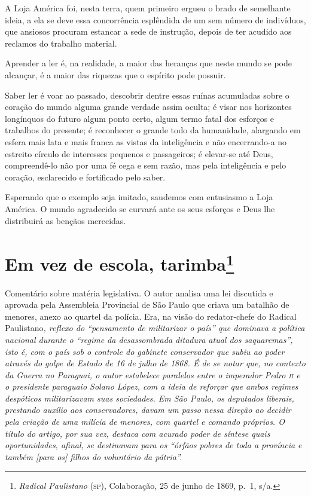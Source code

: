 A Loja América foi, nesta terra, quem primeiro ergueu o brado de
semelhante ideia, a ela se deve essa concorrência esplêndida de um sem
número de indivíduos, que ansiosos procuram estancar a sede de
instrução, depois de ter acudido aos reclamos do trabalho material.

Aprender a ler é, na realidade, a maior das heranças que neste mundo se
pode alcançar, é a maior das riquezas que o espírito pode possuir.

Saber ler é voar ao passado, descobrir dentre essas ruínas acumuladas
sobre o coração do mundo alguma grande verdade assim oculta; é visar nos
horizontes longínquos do futuro algum ponto certo, algum termo fatal dos
esforços e trabalhos do presente; é reconhecer o grande todo da
humanidade, alargando em esfera mais lata e mais franca as vistas da
inteligência e não encerrando-a no estreito círculo de interesses
pequenos e passageiros; é elevar-se até Deus, compreendê-lo não por uma
fé cega e sem razão, mas pela inteligência e pelo coração, esclarecido e
fortificado pelo saber.

Esperando que o exemplo seja imitado, saudemos com entusiasmo a Loja
América. O mundo agradecido se curvará ante os seus esforços e Deus lhe
distribuirá as bençãos merecidas.

\chapter{Em vez de escola, tarimba\footnote{\emph{Radical Paulistano}
  (\textsc{sp}), Colaboração, 25 de junho de 1869, p.~1, s/a.}}

\begin{didascalia}
Comentário sobre matéria legislativa. O autor analisa uma lei discutida
e aprovada pela Assembleia Provincial de São Paulo que criava um
batalhão de menores, anexo ao quartel da polícia. Era, na visão do
redator-chefe do Radical Paulistano\emph{, reflexo do ``pensamento de
militarizar o país'' que dominava a política nacional durante o ``regime
da desassombrada ditadura atual dos saquaremas'', isto é, com o país sob
o controle do gabinete conservador que subiu ao poder através do golpe
de Estado de 16 de julho de 1868. É de se notar que, no contexto da
Guerra no Paraguai, o autor estabelece paralelos entre o imperador Pedro
\textsc{ii} e o presidente paraguaio Solano López, com a ideia de reforçar que
ambos regimes despóticos militarizavam suas sociedades. Em São Paulo, os
deputados liberais, prestando auxílio aos conservadores, davam um passo
nessa direção ao decidir pela criação de uma milícia de menores, com
quartel e comando próprios. O título do artigo, por sua vez, destaca com
acurado poder de síntese quais oportunidades, afinal, se destinavam para
os ``órfãos pobres de toda a província e também {[}para os{]} filhos do
voluntário da pátria''.}
\end{didascalia}

